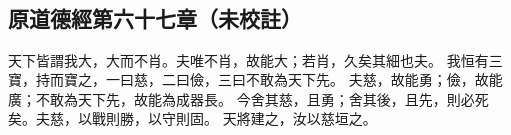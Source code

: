 ﻿%
%

\chapter{~}

\section{原道德經第六十七章（未校註）}

\begin{withgezhu}

\zhsong


天下皆謂我大，大而不肖。夫唯不肖，故能大；若肖，久矣其細也夫。
我恒有三寶，\textcolor{tongjia-color}{持而寶之}，一曰慈，二曰儉，三曰不敢為天下先。
夫慈，故能勇；儉，故能廣；不敢為天下先，故能為成器長。
今舍其慈，且勇；舍其後，且先，則必死矣。夫慈，以戰則勝，以守則固。
天將建之，汝以慈垣之。

\end{withgezhu}

